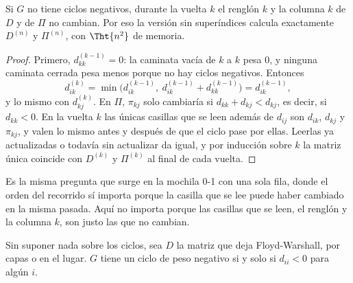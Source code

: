 \documentclass[11pt,letterpaper]{article}
\begin{document}
\begin{proposicion}
  \label{prop:floyd-lugar}
  Si $G$ no tiene ciclos negativos, durante la vuelta $k$ el renglón
  $k$ y la columna $k$ de $D$ y de $\Pi$ no cambian. Por eso la versión
  sin superíndices calcula exactamente $D^{(n)}$ y $\Pi^{(n)}$, con
  $\Tht{n^2}$ de memoria.
\end{proposicion}

\begin{proof}
  Primero, $d^{(k-1)}_{kk} = 0$: la caminata vacía de $k$ a $k$ pesa
  $0$, y ninguna caminata cerrada pesa menos porque no hay ciclos
  negativos. Entonces
  \[
    d^{(k)}_{ik} = \min\bigl(d^{(k-1)}_{ik},\
                   d^{(k-1)}_{ik} + d^{(k-1)}_{kk}\bigr)
                 = d^{(k-1)}_{ik} ,
  \]
  y lo mismo con $d^{(k)}_{kj}$. En $\Pi$, $\pi_{kj}$ solo cambiaría si
  $d_{kk} + d_{kj} < d_{kj}$, es decir, si $d_{kk} < 0$. En la vuelta
  $k$ las únicas casillas que se leen además de $d_{ij}$ son $d_{ik}$,
  $d_{kj}$ y $\pi_{kj}$, y valen lo mismo antes y después de que el
  ciclo pase por ellas. Leerlas ya actualizadas o todavía sin
  actualizar da igual, y por inducción sobre $k$ la matriz única
  coincide con $D^{(k)}$ y $\Pi^{(k)}$ al final de cada vuelta.
\end{proof}

Es la misma pregunta que surge en la mochila 0-1 con una sola fila,
donde el orden del recorrido sí importa porque la casilla que se lee
puede haber cambiado en la misma pasada. Aquí no importa porque las
casillas que se leen, el renglón y la columna $k$, son justo las que
no cambian.

\begin{teorema}
  \label{teo:floyd-diagonal}
  Sin suponer nada sobre los ciclos, sea $D$ la matriz que deja
  Floyd-Warshall, por capas o en el lugar. $G$ tiene un ciclo de peso
  negativo si y solo si $d_{ii} < 0$ para algún $i$.
\end{teorema}
\end{document}
